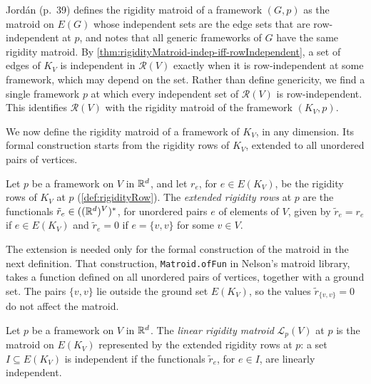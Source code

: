 Jord\'an (p.~39) defines the rigidity matroid of a framework $(G, p)$
as the matroid on $E(G)$ whose independent sets are the edge sets that
are row-independent at $p$, and notes that all generic frameworks of
$G$ have the same rigidity matroid. By
\cref{thm:rigidityMatroid-indep-iff-rowIndependent}, a set of edges of
$K_V$ is independent in $\mathcal{R}(V)$ exactly when it is
row-independent at some framework, which may depend on the set. Rather
than define genericity, we find a single framework $p$ at which every
independent set of $\mathcal{R}(V)$ is row-independent. This
identifies $\mathcal{R}(V)$ with the rigidity matroid of the framework
$(K_V, p)$.

We now define the rigidity matroid of a framework of $K_V$, in any
dimension. Its formal construction starts from the rigidity rows of
$K_V$, extended to all unordered pairs of vertices.

\begin{definition}
  \label{def:linearRigidityRow}
  \leanok
  Let $p$ be a framework on $V$ in ${\mathbb{R}}^{d}$, and let $r_e$, for
  $e \in E(K_V)$, be the rigidity rows of $K_V$ at $p$
  (\cref{def:rigidityRow}). The \emph{extended rigidity rows} at $p$ are
  the functionals $\tilde r_e \in (({\mathbb{R}}^{d})^{V})^{*}$, for unordered
  pairs $e$ of elements of $V$, given by $\tilde r_e = r_e$ if
  $e \in E(K_V)$ and $\tilde r_e = 0$ if $e = \{v, v\}$ for some
  $v \in V$.
\end{definition}
\begin{fmlnote}
  The extension is needed only for the formal construction of the
  matroid in the next definition. That construction,
  \texttt{Matroid.ofFun} in Nelson's matroid library, takes a function
  defined on all unordered pairs of vertices, together with a ground
  set. The pairs $\{v, v\}$ lie outside the ground set $E(K_V)$, so
  the values $\tilde r_{\{v, v\}} = 0$ do not affect the matroid.
\end{fmlnote}

\begin{definition}
  \label{def:linearRigidityMatroid}
  \leanok
  Let $p$ be a framework on $V$ in ${\mathbb{R}}^{d}$. The \emph{linear rigidity
  matroid} $\mathcal{L}_p(V)$ at $p$ is the matroid on $E(K_V)$
  represented by the extended rigidity rows at $p$: a set
  $I \subseteq E(K_V)$ is independent if the functionals $\tilde r_e$,
  for $e \in I$, are linearly independent.
\end{definition}

